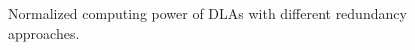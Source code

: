 \begin{figure}
\setlength{\abovecaptionskip}{-10pt}
\setlength{\belowcaptionskip}{-2pt}
    \caption{Normalized computing power of DLAs with different redundancy approaches.}
\label{fig:available}
\vspace{-1em}
\end{figure}

